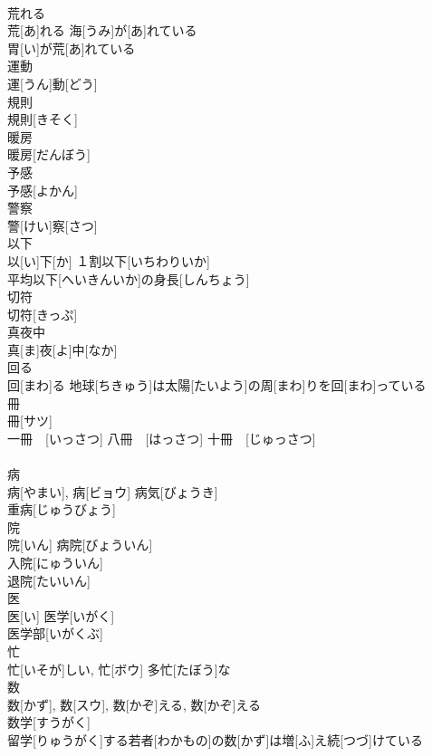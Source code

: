 \documentclass[8pt]{extreport}
\begin{document}
\begin{CJK}{UTF8}{min}
\\	荒れる	
\\	荒[あ]れる	海[うみ]が[あ]れている 
\\	胃[い]が荒[あ]れている 
\\	運動	
\\	運[うん]動[どう]	
\\	規則	
\\	規則[きそく]	
\\	暖房	
\\	暖房[だんぼう]	
\\	予感	
\\	予感[よかん]	
\\	警察	
\\	警[けい]察[さつ]	
\\	以下	
\\	以[い]下[か]	１割以下[いちわりいか] 
\\	平均以下[へいきんいか]の身長[しんちょう] 
\\	切符	
\\	切符[きっぷ]	
\\	真夜中	
\\	真[ま]夜[よ]中[なか]	
\\	回る	
\\	回[まわ]る	地球[ちきゅう]は太陽[たいよう]の周[まわ]りを回[まわ]っている 
\\	冊	
\\	冊[サツ]	
\\	一冊　[いっさつ] 八冊　[はっさつ] 十冊　[じゅっさつ]　
\\	[じっさつ]
\\	病	
\\	病[やまい], 病[ビョウ]	病気[びょうき] 
\\	重病[じゅうびょう] 
\\	院	
\\	院[いん]	病院[びょういん] 
\\	入院[にゅういん] 
\\	退院[たいいん] 
\\	医	
\\	医[い]	医学[いがく] 
\\	医学部[いがくぶ] 
\\	忙	
\\	忙[いそが]しい, 忙[ボウ]	多忙[たぼう]な 
\\	数	
\\	数[かず], 数[スウ], 数[かぞ]える,	数[かぞ]える 
\\	数学[すうがく] 
\\	留学[りゅうがく]する若者[わかもの]の数[かず]は増[ふ]え続[つづ]けている 

\end{CJK}
\end{document}
